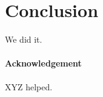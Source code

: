 \documentclass{llncs}
\begin{document}


\section{Conclusion} \label{section:conclusion}

We did it.

\paragraph{Acknowledgement}
XYZ helped.



\end{document}
